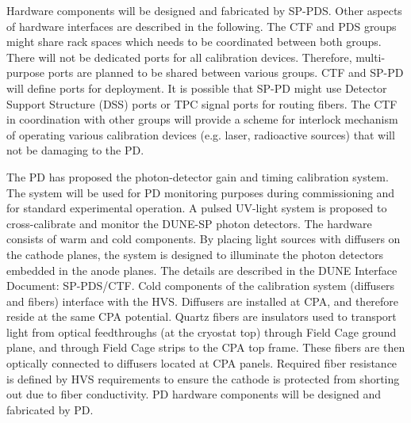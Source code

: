 Hardware components will be designed and fabricated by SP-PDS. Other aspects of hardware interfaces are described in the following. The CTF and PDS groups might share rack spaces which needs to be coordinated between both groups. There will not be dedicated ports for all calibration devices. Therefore, multi-purpose ports are planned to be shared between various groups. CTF and SP-PD will define ports for deployment. It is possible that SP-PD might use Detector Support Structure (DSS) ports or TPC signal ports for routing fibers. The CTF in coordination with other groups will provide a scheme for interlock mechanism of operating various calibration devices (e.g. laser, radioactive sources) that will not be damaging to the PD. 

The PD has proposed the photon-detector gain and timing calibration system. The system will be used for PD monitoring purposes during commissioning and for standard experimental operation. A pulsed UV-light system is proposed to cross-calibrate and monitor the DUNE-SP photon detectors. The hardware consists of warm and cold components. By placing light sources with diffusers on the cathode planes, the system is designed to illuminate the photon detectors embedded in the anode planes. The details are described in the DUNE Interface Document: SP-PDS/CTF. Cold components of the calibration system (diffusers and fibers) interface with the HVS. Diffusers are installed at CPA, and therefore reside at the same CPA potential. Quartz fibers are insulators used to transport light from optical feedthroughs (at the cryostat top) through Field Cage ground plane, and through Field Cage strips to the CPA top frame. These fibers are then optically connected to diffusers located at CPA panels. Required fiber resistance is defined by HVS requirements to ensure the cathode is protected from shorting out due to fiber conductivity. PD hardware components will be designed and fabricated by PD.







